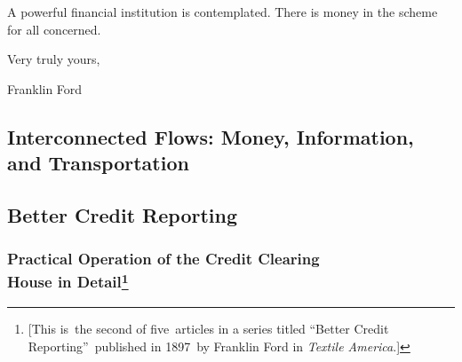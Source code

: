 \documentclass[openany,nobib]{tufte-book}
\let\oldchapter\chapter
\def\chapter{%
  \setcounter{footnote}{0}%
  \oldchapter
}
\begin{document}
A powerful financial institution is contemplated. There is money in the
scheme for all concerned.~
\vspace{0.2in}
\begin{center}
    

Very truly yours,~
\end{center}

\vspace{0.1in}

\hspace{2in}Franklin Ford~~
\begin{fullwidth}


\part{Interconnected Flows: Money, Information, and Transportation}

\end{fullwidth}

\chapter[Better Credit Reporting]{Better Credit Reporting}
\label{ch:Better Credit Reporting}

\vspace{.2in}

\begin{LARGE}


\end{LARGE}

\vspace{0.5in}


\hypertarget{practical-operation-of-the-credit-clearing-house-in-detail}{%
\section[Practical Operation of the Credit Clearing House in
Detail]{\texorpdfstring{Practical Operation of the Credit Clearing\\\noindent House
in
Detail\footnote{{[}This is~the second of five~articles in a series
  titled ``Better Credit Reporting''~published in 1897~by Franklin Ford
  in \emph{Textile America}.{]}}}{Practical Operation of the Credit Clearing House in Detail}}\label{practical-operation-of-the-credit-clearing-house-in-detail}}
\end{document}
